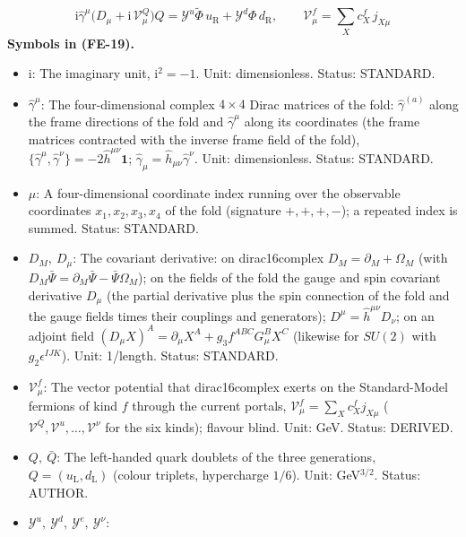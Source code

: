 \documentclass[
  10pt,
]{article}
\providecommand{\tightlist}{%
  \setlength{\itemsep}{0pt}\setlength{\parskip}{0pt}}
\begin{document}
\[
\mathrm{i}\hat\gamma^\mu\big(D_\mu + \mathrm{i}\,\mathcal{V}^{Q}_\mu\big)Q = \mathcal{Y}^{u}\tilde\Phi\,u_{\mathrm{R}}
 + \mathcal{Y}^{d}\Phi\,d_{\mathrm{R}},\qquad \mathcal{V}^{f}_\mu = \sum_X c^{f}_X\,j_{X\mu} \tag{FE-19}
\] \textbf{Symbols in (FE-19).}

\begin{itemize}
\tightlist
\item
  \(\mathrm{i}\): The imaginary unit, \(\mathrm{i}^2 = -1\). Unit:
  dimensionless. Status: STANDARD.
\item
  \(\hat\gamma^\mu\): The four-dimensional complex \(4 \times 4\) Dirac
  matrices of the fold: \(\hat\gamma^{(a)}\) along the frame directions
  of the fold and \(\hat\gamma^\mu\) along its coordinates (the frame
  matrices contracted with the inverse frame field of the fold),
  \(\{\hat\gamma^\mu, \hat\gamma^\nu\} = -2\hat h^{\mu\nu}\mathbf{1}\);
  \(\hat\gamma_\mu = \hat h_{\mu\nu}\hat\gamma^\nu\). Unit:
  dimensionless. Status: STANDARD.
\item
  \(\mu\): A four-dimensional coordinate index running over the
  observable coordinates \(x_1, x_2, x_3, x_4\) of the fold (signature
  \(+,+,+,-\)); a repeated index is summed. Status: STANDARD.
\item
  \(D_M,\ D_\mu\): The covariant derivative: on dirac16complex
  \(D_M = \partial_M + \Omega_M\) (with
  \(D_M\bar\Psi = \partial_M\bar\Psi - \bar\Psi\Omega_M\)); on the
  fields of the fold the gauge and spin covariant derivative \(D_\mu\)
  (the partial derivative plus the spin connection of the fold and the
  gauge fields times their couplings and generators);
  \(D^\mu = \hat h^{\mu\nu}D_\nu\); on an adjoint field
  \((D_\mu X)^A = \partial_\mu X^A + g_3f^{ABC}G^B_\mu X^C\) (likewise
  for \(SU(2)\) with \(g_2\epsilon^{IJK}\)). Unit: 1/length. Status:
  STANDARD.
\item
  \(\mathcal{V}^{f}_\mu\): The vector potential that dirac16complex
  exerts on the Standard-Model fermions of kind \(f\) through the
  current portals, \(\mathcal{V}^{f}_\mu = \sum_Xc^{f}_Xj_{X\mu}\)
  (\(\mathcal{V}^{Q}, \mathcal{V}^{u}, \dots, \mathcal{V}^{\nu}\) for
  the six kinds); flavour blind. Unit: GeV. Status: DERIVED.
\item
  \(Q,\ \bar Q\): The left-handed quark doublets of the three
  generations, \(Q = (u_{\mathrm{L}}, d_{\mathrm{L}})\) (colour
  triplets, hypercharge \(1/6\)). Unit: GeV\(^{3/2}\). Status: AUTHOR.
\item
  \(\mathcal{Y}^{u},\ \mathcal{Y}^{d},\ \mathcal{Y}^{e},\ \mathcal{Y}^{\nu}\):

\end{itemize}
\end{document}
